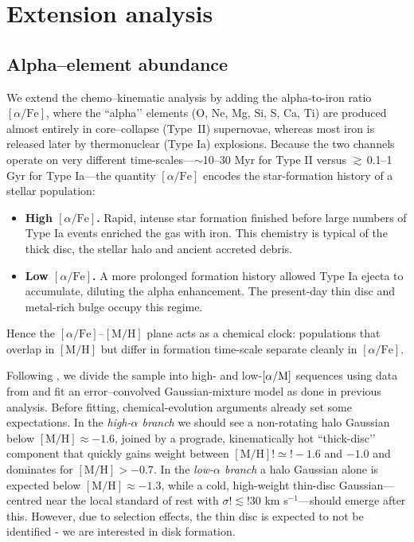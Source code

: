\documentclass[a4paper,12pt]{article}
\begin{document}
\section{Extension analysis}
\subsection{Alpha–element abundance}\label{subsec:alpha}

We extend the chemo–kinematic analysis by adding the
alpha-to-iron ratio $[\alpha/\mathrm{Fe}]$, where the “alpha’’ elements
(O, Ne, Mg, Si, S, Ca, Ti) are produced almost entirely in core–collapse
(\hbox{Type II}) supernovae, whereas most iron is released later by
thermonuclear (Type Ia) explosions.  Because the two channels operate on
very different time-scales—$\sim$10–30 Myr for Type II versus
$\gtrsim$\,0.1–1 Gyr for Type Ia—the quantity $[\alpha/\mathrm{Fe}]$
encodes the star-formation history of a stellar population:

\begin{itemize}
  \item \textbf{High $[\alpha/\mathrm{Fe}]$.}  
        Rapid, intense star formation finished before large numbers of
        Type Ia events enriched the gas with iron.  This chemistry is
        typical of the thick disc, the stellar halo and ancient accreted
        debris.

  \item \textbf{Low $[\alpha/\mathrm{Fe}]$.}  
        A more prolonged formation history allowed Type Ia ejecta to
        accumulate, diluting the alpha enhancement.  The present-day thin
        disc and metal-rich bulge occupy this regime.
\end{itemize}

Hence the $[\alpha/\mathrm{Fe}]$–$[\mathrm{M/H}]$ plane acts as a chemical
clock: populations that overlap in $[\mathrm{M/H}]$ but differ in formation
time-scale separate cleanly in $[\alpha/\mathrm{Fe}]$.

Following \citet{Vis2024}, we divide the sample into high- and low-$[\alpha/{\rm M}]$ 
sequences using data from \citet{Li2024} and fit an error–convolved Gaussian-mixture model
as done in previous analysis. Before fitting, chemical-evolution 
arguments already set some expectations. In the \textit{high-$\alpha$ branch} we should 
see a non-rotating halo Gaussian below $[\mathrm{M/H}]\approx-1.6$, joined by a 
prograde, kinematically hot “thick-disc’’ component that quickly gains weight between 
$[\mathrm{M/H}]!\simeq!-1.6$ and $-1.0$ and dominates for $[\mathrm{M/H}]>-0.7$. In 
the \textit{low-$\alpha$ branch} a halo Gaussian alone is expected below 
$[\mathrm{M/H}]\approx-1.3$, while a cold, high-weight thin-disc Gaussian—centred 
near the local standard of rest with $\sigma!\lesssim!30$ km s$^{-1}$—should emerge 
after this. However, due to selection effects, the thin disc is expected to not be 
identified - we are interested in disk formation.
\end{document}

